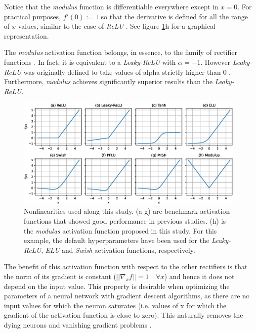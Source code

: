Notice that the \textit{modulus} function is differentiable everywhere except in $x = 0$. For practical purposes,  $f'(0) := 1$  so that the derivative is defined for all the range of $x$ values, similar to the case of \textit{ReLU} \autocite{Goodfellow2016}. See figure \ref{fig:activations}h for a graphical representation.


The \textit{modulus} activation function belongs, in essence, to the family of rectifier functions \autocite{glorot2015} . In fact, it is equivalent to a \textit{Leaky-ReLU} with $\alpha=-1$. However \textit{Leaky-ReLU} was originally defined to take values of alpha strictly higher than 0 \autocite{xu2015}. Furthermore, \textit{modulus} achieves significantly superior results than the \textit{Leaky-ReLU}.

\begin{figure}[h!]
	\centering
	\includegraphics[width=1.0\linewidth]{modulus/images/activations}
	\caption{Nonlinearities used along this study. (a-g) are benchmark activation functions that showed good performance in previous studies. (h) is the \textit{modulus} activation function proposed in this study. For this example, the default hyperparameters have been used for the \textit{Leaky-ReLU}, \textit{ELU} and \textit{Swish} activation functions, respectively.
	}
	\label{fig:activations}
\end{figure}

The benefit of this activation function with respect to the other rectifiers is that the norm of its gradient is constant ($||\nabla_x f|| = 1 \quad \forall x$) and hence it does not depend on the input value. This property is desirable when optimizing the parameters of a neural network with gradient descent algorithms, as there are no input values for which the neuron saturates \autocite{glorot2010} (i.e. values of x for which the gradient of the activation function is close to zero). This naturally removes the dying neurons \autocite{lu2020} and vanishing gradient problems \autocite{pascanu13, hochreiter1998, Hochreiter2001}.

